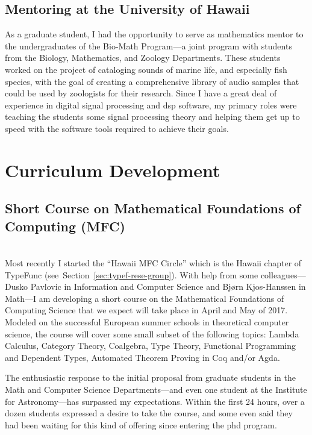 \subsection{Mentoring at the University of Hawaii}
As a graduate student, I had the opportunity to serve as mathematics mentor to the undergraduates of the Bio-Math Program---a joint program with students from the Biology, Mathematics, and Zoology Departments.  These students worked on the project of cataloging sounds of marine life, and especially fish species, with
the goal of creating a comprehensive library of audio samples that could be used by zoologists for their research.  Since I have a great deal of experience in digital signal processing and dsp software, my primary roles were teaching the students some signal processing theory and helping them get up to speed with the software tools required to achieve their goals. 


\newpage
\pagestyle{fancy}\chead{} 
 \lfoot{} \rfoot{\thepage} \cfoot{}

\section{Curriculum Development}

\smallskip

\subsection{Short Course on Mathematical Foundations of Computing (MFC)}~\\
Most recently I started the ``Hawaii MFC Circle'' which is the Hawaii chapter of
TypeFunc (see~Section~\ref{sec:typef-rese-group}). With  help from some colleagues---Dusko Pavlovic in Information and Computer Science and Bj{\o}rn Kjos-Hanssen in Math---I am developing a short course on the
Mathematical Foundations of Computing Science that we expect will take place in April and May of 2017.
Modeled on the successful European summer schools in theoretical computer science, the course will cover some small subset of the following topics: Lambda Calculus, Category Theory, Coalgebra, Type Theory,
Functional Programming and Dependent Types, Automated Theorem Proving in Coq and/or Agda.

The enthusiastic response to the initial proposal from graduate students in the Math and Computer Science Departments---and even one student at the Institute for Astronomy---has surpassed my expectations.
Within the first 24 hours, over a dozen students expressed a desire to take the course, and some even said they had been waiting for this kind of offering since entering the phd program.

